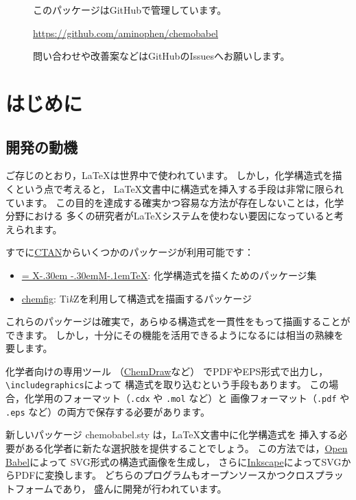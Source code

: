 \documentclass[12pt]{ltjsarticle}
\def\XyM{\ifnum\fam=-1\relax\fam=0\relax\fi\TestCount=\fam%
X\kern-.30em\smash{\raise.50ex\hbox{$\fam\TestCount\Upsilon$}}%
\kern-.30em{M}}
\def\XyMTeX{\XyM\kern-.1em\TeX}
\begin{document}
\begin{figure}[ht]
\centering
このパッケージはGitHubで管理しています。\par
\url{https://github.com/aminophen/chemobabel}\par
問い合わせや改善案などはGitHubのIssuesへお願いします。
\end{figure}

\clearpage
\setcounter{tocdepth}{3}
\tableofcontents

\clearpage
{}

\section{はじめに}

\subsection{開発の動機}

ご存じのとおり，\LaTeX は世界中で使われています。
しかし，化学構造式を描くという点で考えると，
\LaTeX 文書中に構造式を挿入する手段は非常に限られています。
この目的を達成する確実かつ容易な方法が存在しないことは，化学分野における
多くの研究者が\LaTeX システムを使わない要因になっていると考えられます。

すでに\href{http://www.ctan.org/}{CTAN}からいくつかのパッケージが利用可能です：
\begin{itemize}
  \item \href{http://www.ctan.org/pkg/xymtex}{\XyMTeX}:
    化学構造式を描くためのパッケージ集
  \item \href{http://www.ctan.org/pkg/chemfig}{\textsf{chemfig}}:
    Ti\textit{k}Zを利用して構造式を描画するパッケージ
\end{itemize}
これらのパッケージは確実で，あらゆる構造式を一貫性をもって描画することができます。
しかし，十分にその機能を活用できるようになるには相当の熟練を要します。

化学者向けの専用ツール
（\href{http://www.cambridgesoft.com/Ensemble_for_Chemistry/ChemDraw/}{ChemDraw}など）
でPDFやEPS形式で出力し，\verb|\includegraphics|によって
構造式を取り込むという手段もあります。
この場合，化学用のフォーマット（\verb|.cdx| や \verb|.mol| など）と
画像フォーマット（\verb|.pdf| や \verb|.eps| など）の両方で保存する必要があります。

新しいパッケージ \textsf{chemobabel.sty} は，\LaTeX 文書中に化学構造式を
挿入する必要がある化学者に新たな選択肢を提供することでしょう。
この方法では，\href{http://openbabel.org/}{Open Babel}によって
SVG形式の構造式画像を生成し，
さらに\href{https://inkscape.org/ja/}{Inkscape}によってSVGからPDFに変換します。
どちらのプログラムもオープンソースかつクロスプラットフォームであり，
盛んに開発が行われています。
\end{document}

